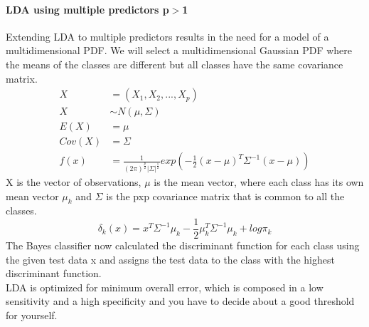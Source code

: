 \documentclass[../document.tex]{subfiles}
\begin{document}
	\paragraph{LDA using multiple predictors p\(>\)1}
	Extending LDA to multiple predictors results in the need for a model of a multidimensional PDF. We will select a multidimensional Gaussian PDF where the means of the classes are different but all classes have the same covariance matrix.
	\begin{equation}
	\begin{split}
		X&=(X_{1},X_{2},...,X_{p})\\
		X&\sim N(\mu,\Sigma)\\
		E(X)&=\mu\\
		Cov(X)&=\Sigma\\
		f(x)&=\frac{1}{(2\pi)^\frac{p}{2}|\Sigma|^\frac{1}{2}}exp(-\frac{1}{2}(x-\mu)^T\Sigma^{-1}(x-\mu))
	\end{split}
	\end{equation}
	X is the vector of observations, \(\mu\) is the mean vector, where each class has its own mean vector \(\mu_{k}\) and \(\Sigma\) is the pxp covariance matrix that is common to all the classes.
	\begin{equation}
		\delta_{k}(x)=x^T\Sigma^{-1}\mu_{k}-\frac{1}{2}\mu_{k}^T\Sigma^{-1}\mu_{k}+log\pi_{k}
	\end{equation}
	The Bayes classifier now calculated the discriminant function for each class using the given test data x and assigns the test data to the class with the highest discriminant function.\\
	LDA is optimized for minimum overall error, which is composed in a low sensitivity and a high specificity and you have to decide about a good threshold for yourself.
\end{document}
